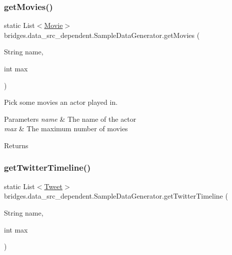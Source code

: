 \mbox{\label{classbridges_1_1data__src__dependent_1_1_sample_data_generator_a5b654cc82316f320ad9b001aa7cdcfb9}} 
\subsubsection{\texorpdfstring{getMovies()}{getMovies()}}
{\footnotesize\ttfamily static List$<$\mbox{\hyperlink{classbridges_1_1data__src__dependent_1_1_movie}{Movie}}$>$ bridges.\+data\+\_\+src\+\_\+dependent.\+Sample\+Data\+Generator.\+get\+Movies (\begin{DoxyParamCaption}\item[{String}]{name,  }\item[{int}]{max }\end{DoxyParamCaption})\hspace{0.3cm}{\ttfamily [static]}}

Pick some movies an actor played in. 
\begin{DoxyParams}{Parameters}
{\em name} & The name of the actor \\
\hline
{\em max} & The maximum number of movies \\
\hline
\end{DoxyParams}
\begin{DoxyReturn}{Returns}

\end{DoxyReturn}
\mbox{\label{classbridges_1_1data__src__dependent_1_1_sample_data_generator_a9e52e53de820233e76553f5db1a01c80}} 
\subsubsection{\texorpdfstring{getTwitterTimeline()}{getTwitterTimeline()}}
{\footnotesize\ttfamily static List$<$\mbox{\hyperlink{classbridges_1_1data__src__dependent_1_1_tweet}{Tweet}}$>$ bridges.\+data\+\_\+src\+\_\+dependent.\+Sample\+Data\+Generator.\+get\+Twitter\+Timeline (\begin{DoxyParamCaption}\item[{String}]{name,  }\item[{int}]{max }\end{DoxyParamCaption})\hspace{0.3cm}{\ttfamily [static]}}

